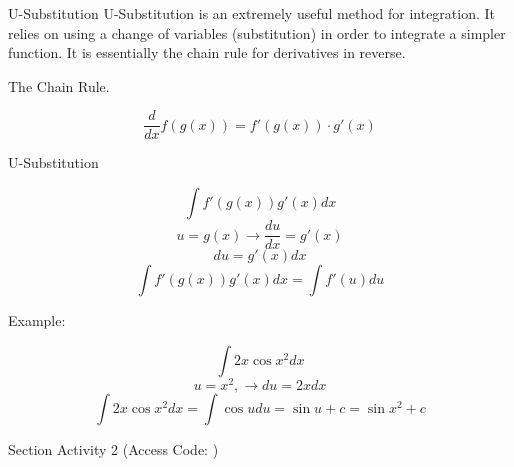 \documentclass{beamer}
\begin{document}
\begin{frame}{U-Substitution}
\scriptsize{
U-Substitution is an extremely useful method for integration. It relies on using a change of variables (substitution) in order to integrate a simpler function. It is essentially the chain rule for derivatives in reverse. }

\normalsize
\vspace{10pt}


The Chain Rule. 

\[
    \frac{d}{dx} f(g(x)) = f'(g(x)) \cdot g'(x)
\]


\end{frame}

\begin{frame}{U-Substitution}

\[
    \int f'(g(x))g'(x) dx
\]
\[
    u = g(x) \to \frac{du}{dx} = g'(x)
\]
\[
    du = g'(x)dx
\]
\[
    \int f'(g(x))g'(x) dx = \int f'(u)du
\]

Example: 

\[
\int 2x\cos{x^2}dx
\]
\[
    u = x^2, \to du = 2xdx
\]
\[
    \int 2x\cos{x^2}dx = \int \cos{u} du = \sin{u} + c = \sin{x^2} + c
\]

\end{frame}

\begin{frame}{Section Activity 2 (Access Code: )}
    
\end{frame}
\end{document}
